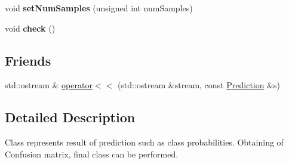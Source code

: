\begin{DoxyCompactItemize}
\item 
\hypertarget{classffactory_1_1_prediction_ad3eb5c05a259c0ebd17cdf881ab40f27}{void {\bfseries set\-Num\-Samples} (unsigned int num\-Samples)}\label{classffactory_1_1_prediction_ad3eb5c05a259c0ebd17cdf881ab40f27}

\item 
\hypertarget{classffactory_1_1_prediction_a3fa2a9b4ed1e470ad9e12150cf7b1ac0}{void {\bfseries check} ()}\label{classffactory_1_1_prediction_a3fa2a9b4ed1e470ad9e12150cf7b1ac0}

\end{DoxyCompactItemize}
\subsection*{Friends}
\begin{DoxyCompactItemize}
\item 
std\-::ostream \& \hyperlink{classffactory_1_1_prediction_a4050dc92621111cb17911b4f2a63d9b7}{operator$<$$<$} (std\-::ostream \&stream, const \hyperlink{classffactory_1_1_prediction}{Prediction} \&s)
\end{DoxyCompactItemize}


\subsection{Detailed Description}
Class represents result of prediction such as class probabilities. Obtaining of Confusion matrix, final class can be performed. 

